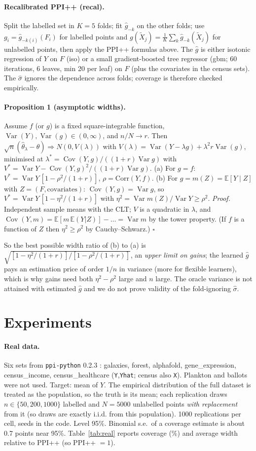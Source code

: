 \documentclass{article}
\newcommand{\E}{\mathbb{E}}\newcommand{\Var}{\operatorname{Var}}\newcommand{\Cov}{\operatorname{Cov}}
\begin{document}
\paragraph{Recalibrated PPI++ (recal).} Split the labelled set in $K=5$ folds; fit $\hat g_{-k}$ on the other folds; use $g_i=\hat g_{-k(i)}(F_i)$ for labelled points and $g(\tilde X_j)=\frac1K\sum_k \hat g_{-k}(\tilde X_j)$ for unlabelled points, then apply the PPI++ formulas above. The $\hat g$ is either isotonic regression of $Y$ on $F$ (iso) or a small gradient-boosted tree regressor (gbm; 60 iterations, 6 leaves, min 20 per leaf) on $F$ (plus the covariates in the census sets). The $\hat\sigma$ ignores the dependence across folds; coverage is therefore checked empirically.
\paragraph{Proposition 1 (asymptotic widths).} Assume $f$ (or $g$) is a fixed square-integrable function, $\Var(Y),\Var(g)\in(0,\infty)$, and $n/N\to r$. Then $\sqrt n(\hat\theta_\lambda-\theta)\Rightarrow N(0,V(\lambda))$ with $V(\lambda)=\Var(Y-\lambda g)+\lambda^2 r\Var(g)$, minimised at $\lambda^*=\Cov(Y,g)/((1+r)\Var g)$ with $V^*=\Var Y-\Cov(Y,g)^2/((1+r)\Var g)$.
(a) For $g=f$: $V^*=\Var Y\,[1-\rho^2/(1+r)]$, $\rho=\mathrm{Corr}(Y,f)$.
(b) For $g=m(Z)=\E[Y\mid Z]$ with $Z=(F,\text{covariates})$: $\Cov(Y,g)=\Var g$, so $V^*=\Var Y\,[1-\eta^2/(1+r)]$ with $\eta^2=\Var m(Z)/\Var Y\ge\rho^2$.
\emph{Proof.} Independent sample means with the CLT; $V$ is a quadratic in $\lambda$, and $\Cov(Y,m)=\E[m\,\E(Y|Z)]-\ldots=\Var m$ by the tower property. (If $f$ is a function of $Z$ then $\eta^2\ge\rho^2$ by Cauchy--Schwarz.) \hfill$\square$

So the best possible width ratio of (b) to (a) is $\sqrt{[1-\eta^2/(1+r)]/[1-\rho^2/(1+r)]}$, an \emph{upper limit on gains}; the learned $\hat g$ pays an estimation price of order $1/n$ in variance (more for flexible learners), which is why gains need both $\eta^2-\rho^2$ large and $n$ large. The oracle variance is not attained with estimated $\hat g$ and we do not prove validity of the fold-ignoring $\hat\sigma$.

\section{Experiments}
\paragraph{Real data.} Six sets from \texttt{ppi-python} 0.2.3 \citep{ppipp}: galaxies, forest, alphafold, gene\_expression, census\_income, census\_healthcare (\texttt{Y},\texttt{Yhat}; census also \texttt{X}). Plankton and ballots were not used. Target: mean of $Y$. The empirical distribution of the full dataset is treated as the population, so the truth is its mean; each replication draws $n\in\{50,200,1000\}$ labelled and $N=5000$ unlabelled points \emph{with replacement} from it (so draws are exactly i.i.d. from this population). 1000 replications per cell, seeds in the code. Level 95\%. Binomial s.e.\ of a coverage estimate is about 0.7 points near 95\%. Table~\ref{tab:real} reports coverage (\%) and average width relative to PPI++ (so PPI++ $=1$).
\end{document}
